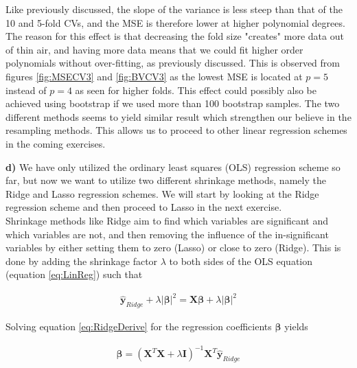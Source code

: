 \documentclass[12pt,a4paper]{article}
\begin{document}
\noindent Like previously discussed, the slope of the variance is less steep than that of the 10 and 5-fold CVs, and the MSE is therefore lower at higher polynomial degrees. The reason for this effect is that decreasing the fold size "creates" more data out of thin air, and having more data means that we could fit higher order polynomials without over-fitting, as previously discussed. This is observed from figures \ref{fig:MSECV3} and \ref{fig:BVCV3} as the lowest MSE is located at $p = 5$ instead of $p = 4$ as seen for higher folds. This effect could possibly also be achieved using bootstrap if we used more than 100 bootstrap samples. The two different methods seems to yield similar result which strengthen our believe in the resampling methods. This allows us to proceed to other linear regression schemes in the coming exercises.

\newpage

\noindent \textbf{d)} We have only utilized the ordinary least squares (OLS) regression scheme so far, but now we want to utilize two different shrinkage methods, namely the Ridge and Lasso regression schemes. We will start by looking at the Ridge regression scheme and then proceed to Lasso in the next exercise. 
\\
Shrinkage methods like Ridge aim to find which variables are significant and which variables are not, and then removing the influence of the in-significant variables by either setting them to zero (Lasso) or close to zero (Ridge). This is done by adding the shrinkage factor $\lambda$ to both sides of the OLS equation (equation \ref{eq:LinReg}) such that

\begin{equation}\label{eq:RidgeDerive}
\begin{aligned}
\boldsymbol{\hat{y}}_{Ridge} + \lambda |\boldsymbol{\beta}|^2 = \textbf{X}\boldsymbol{\beta} + \lambda  |\boldsymbol{\beta}|^2
\end{aligned}
\end{equation}

\noindent Solving equation \ref{eq:RidgeDerive} for the regression coefficients $\boldsymbol{\beta}$ yields

\begin{equation}\label{eq:RidgeDerive2}
\begin{aligned}
\boldsymbol{\beta} = (\textbf{X}^T \textbf{X} + \lambda \textbf{I})^{-1} \textbf{X}^T \boldsymbol{\hat{y}}_{Ridge}
\end{aligned}
\end{equation}
\end{document}
